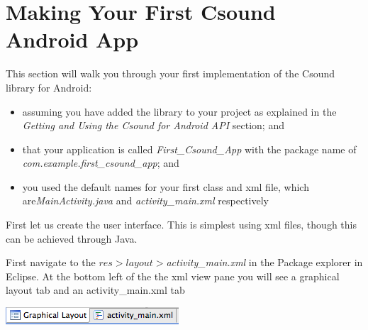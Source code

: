 \documentclass[11pt]{article}
\begin{document}
\section{Making Your First Csound Android App }
This section will walk you through your first implementation of the Csound library for Android: 
\begin{itemize}
\item assuming you have added the library to your project as explained in the \textit{Getting and Using the Csound for Android API} section; and
\item  that your application is called \textit{First_Csound_App} with the package name of \textit{com.example.first_csound_app}; and
\item you used the default names for your first class and xml file, which are\textit{MainActivity.java}  and  \textit{activity_main.xml}  respectively
\end{itemize}

 First let us create the user interface. This is simplest using xml files, though this can be achieved through Java.

First navigate to the $res>layout>$\textit{activity_main.xml} in the Package explorer in Eclipse. At the bottom left of the the xml view pane you will see a graphical layout tab and an activity_main.xml tab
\begin{center}
\includegraphics{images/xmlTabBar}
\end{center}
\end{document}
